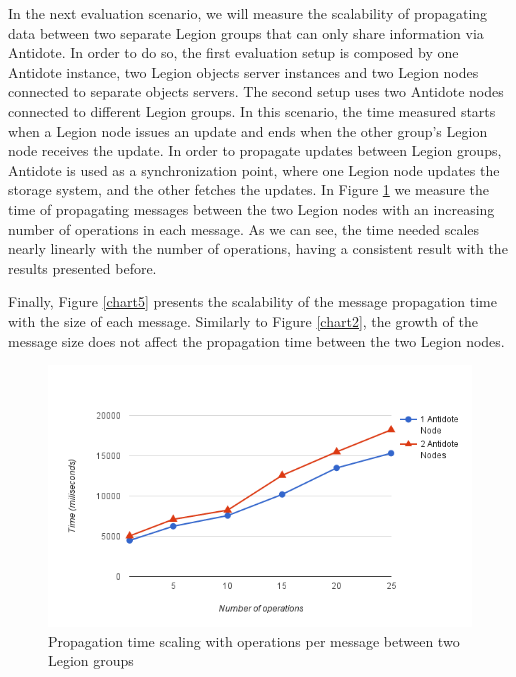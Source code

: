 	In the next evaluation scenario, we will measure the scalability of propagating data between two separate Legion groups that can only share information via Antidote. In order to do so, the first evaluation setup is composed by one Antidote instance, two Legion objects server instances and two Legion nodes connected to separate objects servers. The second setup uses two Antidote nodes connected to different Legion groups. In this scenario, the time measured starts when a Legion node issues an update and ends when the other group's Legion node receives the update. In order to propagate updates between Legion groups, Antidote is used as a synchronization point, where one Legion node updates the storage system, and the other fetches the updates. In Figure \ref{chart4} we measure the time of propagating messages between the two Legion nodes with an increasing number of operations in each message. As we can see, the time needed scales nearly linearly with the number of operations, having a consistent result with the results presented before.\par
	Finally, Figure \ref{chart5} presents the scalability of the message propagation time with the size of each message. Similarly to Figure \ref{chart2}, the growth of the message size does not affect the propagation time between the two Legion nodes.

\begin{figure}[H]
\centering
\includegraphics[scale=0.7]{files/chart4.png}
\caption{Propagation time scaling with operations per message between two Legion groups}
\label{chart4}
\end{figure}

